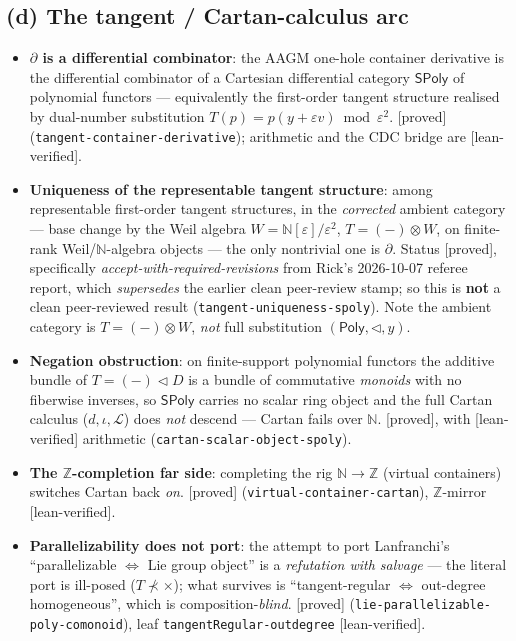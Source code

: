 \documentclass[11pt]{article}
\newcommand{\Poly}{\mathsf{Poly}}
\newcommand{\reg}[1]{\texttt{#1}}
\newcommand{\grade}[1]{\textsf{[#1]}}
\begin{document}
\subsection{(d) The tangent / Cartan-calculus arc}\label{sec:tangent}

\begin{itemize}[leftmargin=1.2em]
\item \textbf{$\partial$ is a differential combinator}: the AAGM one-hole container
derivative is the differential combinator of a Cartesian differential category $\mathsf{SPoly}$
of polynomial functors --- equivalently the first-order tangent structure realised by
dual-number substitution $T(p)=p(y+\varepsilon v)\bmod\varepsilon^2$. \grade{proved}
(\reg{tangent-container-derivative}); arithmetic and the CDC bridge are \grade{lean-verified}.
\item \textbf{Uniqueness of the representable tangent structure}: among representable
first-order tangent structures, in the \emph{corrected} ambient category --- base change by
the Weil algebra $W=\mathbb{N}[\varepsilon]/\varepsilon^2$, $T=(-)\otimes W$, on finite-rank
Weil/$\mathbb{N}$-algebra objects --- the only nontrivial one is $\partial$. Status
\grade{proved}, specifically \emph{accept-with-required-revisions} from Rick's 2026-10-07
referee report, which \emph{supersedes} the earlier clean peer-review stamp; so this is
\textbf{not} a clean peer-reviewed result (\reg{tangent-uniqueness-spoly}). Note the ambient
category is $T=(-)\otimes W$, \emph{not} full substitution $(\Poly,\lhd,y)$.
\item \textbf{Negation obstruction}: on finite-support polynomial functors the additive
bundle of $T=(-)\lhd D$ is a bundle of commutative \emph{monoids} with no fiberwise
inverses, so $\mathsf{SPoly}$ carries no scalar ring object and the full Cartan calculus
($d,\iota,\mathcal{L}$) does \emph{not} descend --- Cartan fails over $\mathbb{N}$.
\grade{proved}, with \grade{lean-verified} arithmetic (\reg{cartan-scalar-object-spoly}).
\item \textbf{The $\mathbb{Z}$-completion far side}: completing the rig
$\mathbb{N}\to\mathbb{Z}$ (virtual containers) switches Cartan back \emph{on}. \grade{proved}
(\reg{virtual-container-cartan}), $\mathbb{Z}$-mirror \grade{lean-verified}.
\item \textbf{Parallelizability does not port}: the attempt to port Lanfranchi's
``parallelizable $\Leftrightarrow$ Lie group object'' is a \emph{refutation with salvage} ---
the literal port is ill-posed ($T\not\prec\times$); what survives is
``tangent-regular $\Leftrightarrow$ out-degree homogeneous'', which is
composition-\emph{blind}. \grade{proved} (\reg{lie-parallelizable-poly-comonoid}), leaf
\texttt{tangentRegular-outdegree} \grade{lean-verified}.
\end{itemize}
\end{document}

